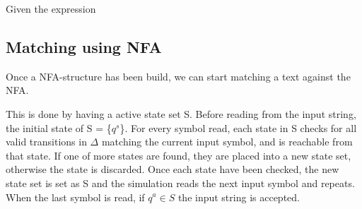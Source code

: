 \begin{myex}
Given the expression 
\end{myex}

%




\subsection{Matching using NFA}
Once a NFA-structure has been build, we can start matching a text against the NFA.

This is done by having a active state set S. Before reading from the input string, the initial state of S = \{$q^s$\}. For every symbol read, each state in S checks for all valid transitions in $\Delta$ matching the current input symbol, and is reachable from that state. If one of more states are found, they are placed into a new state set, otherwise the state is discarded. Once each state have been checked, the new state set is set as S and the simulation reads the next input symbol and repeats. When the last symbol is read, if $q^a \in S$ the input string is accepted.



